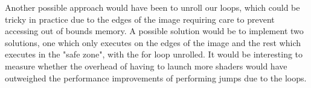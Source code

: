 \documentclass[10pt,journal,compsoc]{IEEEtran}
\begin{document}
\noindent Another possible approach would have been to unroll our loops, which could be tricky in practice due to the edges of the image requiring care to prevent accessing out of bounds memory. A possible solution would be to implement two solutions, one which only executes on the edges of the image and the rest which executes in the "safe zone", with the for loop unrolled. It would be interesting to measure whether the overhead of having to launch more shaders would have outweighed the performance improvements of performing jumps due to the loops.\\


\printbibliography
\end{document}
